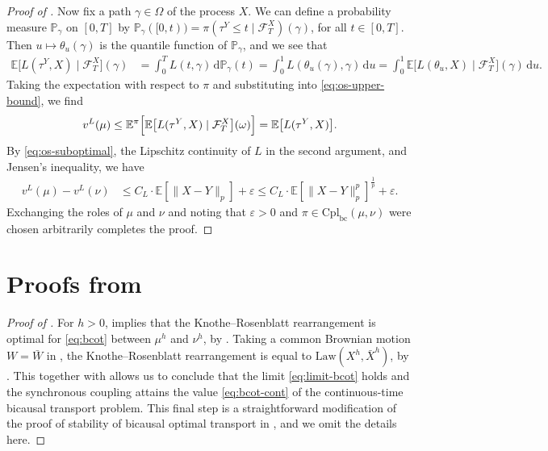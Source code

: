 \documentclass[onseside, final]{amsart}
\theoremstyle{definition}
\newcommand{\F}{\mathcal F}
\newcommand{\E}{\mathbb E}
\renewcommand{\P}{\mathbb P} %
\newcommand{\Law}{\mathrm{Law}}
\newcommand{\D}{\,\mathrm{d}}
\newcommand{\cpl}{\mathrm{Cpl}}
\newcommand{\cplba}{\cpl_{\mathrm{bc}}}
\numberwithin{equation}{section}
\begin{document}
\begin{proof}[Proof of ]
			Now fix a path $\gamma \in \Omega$ of the process $X$. We can define a probability measure $\P_\gamma$ on $[0, T]$ by $\P_\gamma([0, t)) = \pi(\tau^Y \leq t \mid \F^X_T)(\gamma)$, for all $t \in [0, T]$. Then $u \mapsto \theta_u(\gamma)$ is the quantile function of $\P_\gamma$, and we see that
			\begin{equation}
				\begin{split}
					\E\bigl[L(\tau^Y, X) \mid \F^X_T\bigr](\gamma) & = \int_0^T L(t, \gamma) \D \P_\gamma(t) = \int_0^1 L(\theta_u(\gamma), \gamma) \D u = \int_0^1 \E\bigl[L(\theta_u, X) \mid \F^X_T\bigr](\gamma) \D u.
				\end{split}
			\end{equation}
			Taking the expectation with respect to $\pi$ and substituting into \eqref{eq:os-upper-bound}, we find
			\begin{equation}
				v^L(\mu) \leq \E^\pi\Bigl[\E\bigl[L(\tau^Y, X) \mid \F^X_T\bigr](\omega)\Bigr] = \E\!\left[L(\tau^Y, X)\right]\!.
			\end{equation}
			By \eqref{eq:os-suboptimal}, the Lipschitz continuity of $L$ in the second argument, and Jensen's inequality, we have
			\begin{equation}
			\begin{split}
				v^L(\mu) - v^L(\nu) & \leq C_L \cdot \E\!\left[\|X - Y\|_p\right]\! + \varepsilon \leq C_L \cdot \E{\left[\|X - Y\|_p^p\right]}^{\frac 1 p} + \varepsilon.
			\end{split}
			\end{equation}
			Exchanging the roles of $\mu$ and $\nu$ and noting that $\varepsilon > 0$ and $\pi \in \cplba(\mu, \nu)$ were chosen arbitrarily completes the proof.
		\end{proof}
				
\appendix
\section{Proofs from }\label{app:prelim}
	\begin{proof}[Proof of ]
		For $h > 0$,  implies that the Knothe--Rosenblatt rearrangement is optimal for \eqref{eq:bcot} between $\mu^h$ and $\nu^h$, by . Taking a common Brownian motion $W = \bar W$ in , the Knothe--Rosenblatt rearrangement is equal to $\Law(X^h, \bar X^h)$, by . This together with  allows us to 
		conclude that the limit \eqref{eq:limit-bcot} holds and the synchronous coupling attains the value \eqref{eq:bcot-cont} of the continuous-time bicausal transport problem. This final step is a straightforward modification of the proof of stability of bicausal optimal transport in \citep[Proposition 2.6, Corollary 2.7]{BaKaRo22}, and we omit the details here.
	\end{proof}
	
\end{document}
